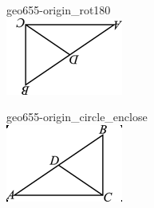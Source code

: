 \documentclass[12pt]{article}
\begin{document}
\begin{center}
\begin{minipage}{0.32\textwidth}
\end{minipage}
\par\medskip
\begin{minipage}{0.32\textwidth}\centering
geo655-origin\_rot180\\
\includegraphics[width=0.95\linewidth]{out_rommath_origin/items/geo655-origin/assets/figure_rot180.png}
\end{minipage}
\hfill\begin{minipage}{0.32\textwidth}\centering
geo655-origin\_circle\_enclose\\
\includegraphics[width=0.95\linewidth]{out_rommath_origin/items/geo655-origin/assets/figure_circle.png}
\end{minipage}
\par
\end{center}
\bigskip
\end{document}
